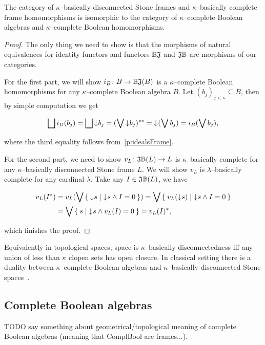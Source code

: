 \begin{theorem*}
    The category of $\kappa$--basically disconnected Stone frames and $\kappa$--basically complete frame homomorphisms is isomorphic to the category of $\kappa$--complete Boolean algebras and $\kappa$--complete Boolean homomorphisms.
\end{theorem*}
\begin{proof}
    The only thing we need to show is that the morphisms of natural equivalences for identity functors and functors $\mathbb{B}\mathfrak{J}$ and $\mathfrak{J}\mathbb{B}$ are morphisms of our categories.

    For the first part, we will show $i_B\colon B \to \mathbb{B}\mathfrak{J}(B)$ is a $\kappa$--complete Boolean homomorphisms for any $\kappa$--complete Boolean algebra $B$. Let $(b_j)_{j < \kappa} \subseteq B$, then by simple computation we get

    $$
        \bigsqcup i_B(b_j) = \bigsqcup \mathord{\downarrow}\mkern1mu b_j = (\bigvee \mathord{\downarrow}\mkern1mu b_j)^{**} = \mathord{\downarrow}\mkern1mu (\bigvee b_j) = i_B(\bigvee b_j),
    $$

    \noindent where the third equality follows from~\ref{p:idealsFrame}.

    For the second part, we need to show $v_L\colon \mathfrak{J}\mathbb{B}(L) \to L$ is $\kappa$--basically complete for any $\kappa$--basically disconnected Stone frame $L$. We will show $v_L$ is $\lambda$--basically complete for any cardinal $\lambda$. Take any $I \in \mathfrak{J}\mathbb{B}(L)$, we have

    \begin{align*}
        v_L(I^*) &= v_L(\bigvee \Set{ \mathord{\downarrow}\mkern1mus | \mathord{\downarrow}\mkern1mus \wedge I = 0 })
                  = \bigvee \Set{ v_L(\mathord{\downarrow}\mkern1mus) | \mathord{\downarrow}\mkern1mus \wedge I = 0 } \\
                 &= \bigvee \Set{ s | \mathord{\downarrow}\mkern1mus \wedge v_L(I) = 0 } = v_L(I)^*,
    \end{align*}

    \noindent which finishes the proof.
\end{proof}

Equivalently in topological spaces, space is $\kappa$--basically disconnectedness iff any union of less than $\kappa$ clopen sets has open closure. In classical setting there is a duality between $\kappa$--complete Boolean algebras and $\kappa$--basically disconnected Stone spaces~\cite{monk1989handbook}.



\subsection{Complete Boolean algebras}
TODO say something about geometrical/topological meaning of complete Boolean algebras (meaning that ComplBool are frames...).

